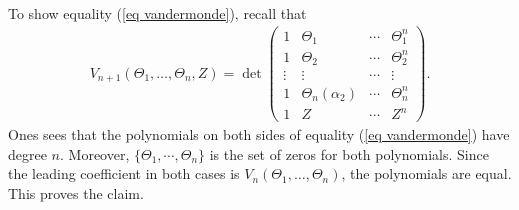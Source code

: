 \begin{Bew}
\begin{align*}
	\end{align*}
	To show equality (\ref{eq vandermonde}), recall that
	\begin{align*}
		V_{n+1}(\Theta_1,\dots,\Theta_n,Z)=\det\begin{pmatrix}
		1 & \Theta_1 &\cdots& \Theta_1^{n} \\
		1 & \Theta_2 & \cdots& \Theta_2^{n} \\
		\vdots &\vdots &\cdots&\vdots\\
		1 & \Theta_n(\alpha_2) &\cdots& \Theta_n^{n} \\
		1 & Z & \cdots & Z^n
		\end{pmatrix}
		.
	\end{align*}
	Ones sees that the polynomials on both sides of equality (\ref{eq vandermonde}) have degree $n$. Moreover, $\{\Theta_1,\cdots,\Theta_n\}$ is the set of zeros for both polynomials. Since the leading coefficient in both cases is $	V_n(\Theta_1,\dots,\Theta_n)$, the polynomials are equal. This proves the claim. 
\end{Bew}

